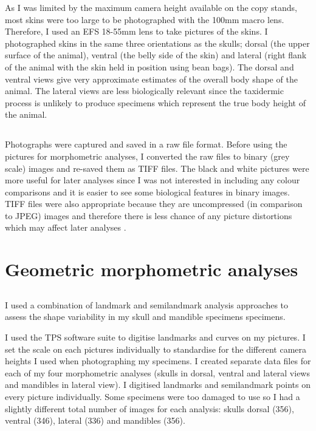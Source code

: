 	As I was limited by the maximum camera height available on the copy stands, most skins were too large to be photographed with the 100mm macro lens. Therefore, I used an EFS 18-55mm lens to take pictures of the skins. I photographed skins in the same three orientations as the skulls; dorsal (the upper surface of the animal), ventral (the belly side of the skin) and lateral (right flank of the animal with the skin held in position using bean bags). The dorsal and ventral views give very approximate estimates of the overall body shape of the animal. The lateral views are less biologically relevant since the taxidermic process is unlikely to produce specimens which represent the true body height of the animal.

\subsection{}
	Photographs were captured and saved in a raw file format. Before using the pictures for morphometric analyses, I converted the raw files to binary (grey scale) images and re-saved them as TIFF files. The black and white pictures were more useful for later analyses since I was not interested in including any colour comparisons and it is easier to see some biological features in binary images. TIFF files were also appropriate because they are uncompressed (in comparison to JPEG) images and therefore there is less chance of any picture distortions which may affect later analyses \citep{HERC2013}.

\section{Geometric morphometric analyses}
\label{sect:morphometrics}

\subsection{}

	I used a combination of landmark and semilandmark analysis approaches to assess the shape variability in my skull and mandible specimens specimens. 

	I used the TPS software suite \citep{Rohlf2013} to digitise landmarks and curves on my pictures. I set the scale on each pictures individually to standardise for the different camera heights I used when photographing my specimens. I created separate data files for each of my four morphometric analyses (skulls in dorsal, ventral and lateral views and mandibles in lateral view). I digitised landmarks and semilandmark points on every picture individually. Some specimens were too damaged to use so I had a slightly different total number of images for each analysis: skulls dorsal (356), ventral (346), lateral (336) and mandibles (356).

